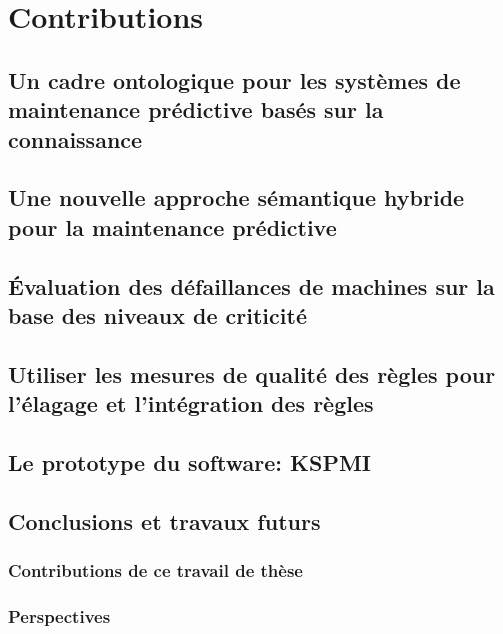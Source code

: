\begin{otherlanguage}{French}
\chapter{Contributions}
\normalsize
\label{ch6fran}

\section{Un cadre ontologique pour les systèmes de maintenance prédictive basés sur la connaissance}

\section{Une nouvelle approche sémantique hybride pour la maintenance prédictive}
\label{ch7fran}

\section{Évaluation des défaillances de machines sur la base des niveaux de criticité}
\label{ch8fran}

\section{Utiliser les mesures de qualité des règles pour l'élagage et l'intégration des règles}
\label{ch9fran}

\section{Le prototype du software: KSPMI}

\section{Conclusions et travaux futurs}
\subsection{Contributions de ce travail de thèse}
\subsection{Perspectives}

\end{otherlanguage}









